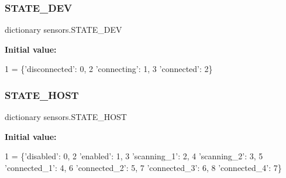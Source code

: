 \subsubsection{\texorpdfstring{S\+T\+A\+T\+E\+\_\+\+D\+EV}{STATE\_DEV}}
{\footnotesize\ttfamily dictionary sensors.\+S\+T\+A\+T\+E\+\_\+\+D\+EV}

{\bfseries Initial value\+:}
\begin{DoxyCode}
1 =  \{\textcolor{stringliteral}{'disconnected'}: 0,
2              \textcolor{stringliteral}{'connecting'}: 1,
3              \textcolor{stringliteral}{'connected'}: 2\}
\end{DoxyCode}
\mbox{\label{namespacesensors_a8322f64bc3ad8586a690ed3784045818}} 
\subsubsection{\texorpdfstring{S\+T\+A\+T\+E\+\_\+\+H\+O\+ST}{STATE\_HOST}}
{\footnotesize\ttfamily dictionary sensors.\+S\+T\+A\+T\+E\+\_\+\+H\+O\+ST}

{\bfseries Initial value\+:}
\begin{DoxyCode}
1 =  \{\textcolor{stringliteral}{'disabled'}: 0,
2               \textcolor{stringliteral}{'enabled'}: 1,
3               \textcolor{stringliteral}{'scanning\_1'}: 2,
4               \textcolor{stringliteral}{'scanning\_2'}: 3,
5               \textcolor{stringliteral}{'connected\_1'}: 4,
6               \textcolor{stringliteral}{'connected\_2'}: 5,
7               \textcolor{stringliteral}{'connected\_3'}: 6,
8               \textcolor{stringliteral}{'connected\_4'}: 7\}
\end{DoxyCode}
